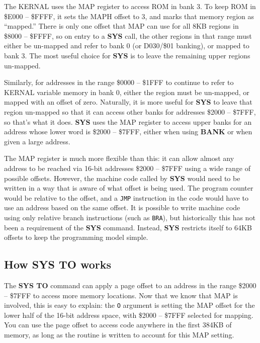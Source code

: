 The KERNAL uses the MAP register to access ROM in bank 3. To keep ROM in \$E000 -- \$FFFF, it sets the MAPH offset to 3, and marks that memory region as ``mapped.'' There is only one offset that MAP can use for all 8KB regions in \$8000 -- \$FFFF, so on entry to a {\bf SYS} call, the other regions in that range must either be un-mapped and refer to bank 0 (or D030/\$01 banking), or mapped to bank 3. The most useful choice for {\bf SYS} is to leave the remaining upper regions un-mapped.

Similarly, for addresses in the range \$0000 -- \$1FFF to continue to refer to KERNAL variable memory in bank 0, either the region must be un-mapped, or mapped with an offset of zero. Naturally, it is more useful for {\bf SYS} to leave that region un-mapped so that it can access other banks for addresses \$2000 -- \$7FFF, so that's what it does. {\bf SYS} uses the MAP register to access upper banks for an address whose lower word is \$2000 -- \$7FFF, either when using {\bf BANK} or when given a large address.

The MAP register is much more flexible than this: it can allow almost any address to be reached via 16-bit addresses \$2000 -- \$7FFF using a wide range of possible offsets. However, the machine code called by {\bf SYS} would need to be written in a way that is aware of what offset is being used. The program counter would be relative to the offset, and a {\tt JMP} instruction in the code would have to use an address based on the same offset. It is possible to write machine code using only relative branch instructions (such as {\tt BRA}), but historically this has not been a requirement of the {\bf SYS} command. Instead, {\bf SYS} restricts itself to 64KB offsets to keep the programming model simple.

\subsection{How SYS TO works}

The {\bf SYS TO} command can apply a page offset to an address in the range \$2000 -- \$7FFF to access more memory locations. Now that we know that MAP is involved, this is easy to explain: the \texttt{O} argument is setting the MAP offset for the lower half of the 16-bit address space, with \$2000 -- \$7FFF selected for mapping. You can use the page offset to access code anywhere in the first 384KB of memory, as long as the routine is written to account for this MAP setting.


